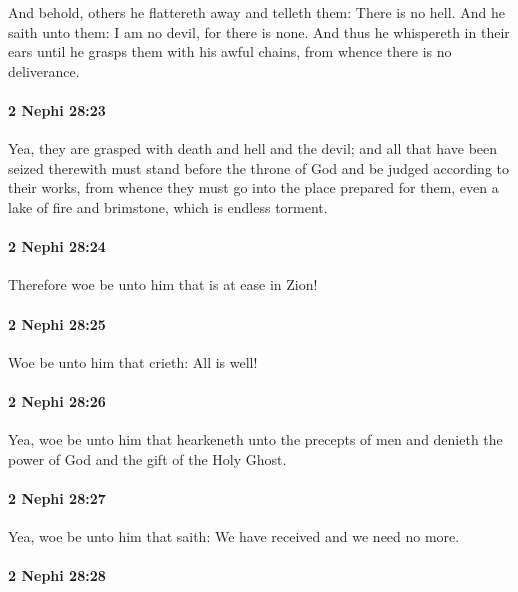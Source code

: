 			And behold, others he flattereth away and telleth them:
			There is no hell.
			And he saith unto them:
			I am no devil,
			for there is none.
			And thus he whispereth in their ears
			until he grasps them with his awful chains,
			from whence there is no deliverance.

		\paragraph{2 Nephi 28:23} %
			\label{2NEPHI-28-23}

			Yea, they are grasped with death and hell and the devil;
			and all that have been seized therewith must stand before the throne of God
			and be judged according to their works,
			from whence they must go into the place prepared for them,
			even a lake of fire and brimstone, which is endless torment.

		\paragraph{2 Nephi 28:24} %
			\label{2NEPHI-28-24}

			Therefore woe be unto him that is at ease in Zion!

		\paragraph{2 Nephi 28:25} %
			\label{2NEPHI-28-25}

			Woe be unto him that crieth:
			All is well!

		\paragraph{2 Nephi 28:26} %
			\label{2NEPHI-28-26}

			Yea, woe be unto him that hearkeneth unto the precepts of men
			and denieth the power of God and the gift of the Holy Ghost.

		\paragraph{2 Nephi 28:27} %
			\label{2NEPHI-28-27}

			Yea, woe be unto him that saith:
			We have received and we need no more.

		\paragraph{2 Nephi 28:28} %
			\label{2NEPHI-28-28}

